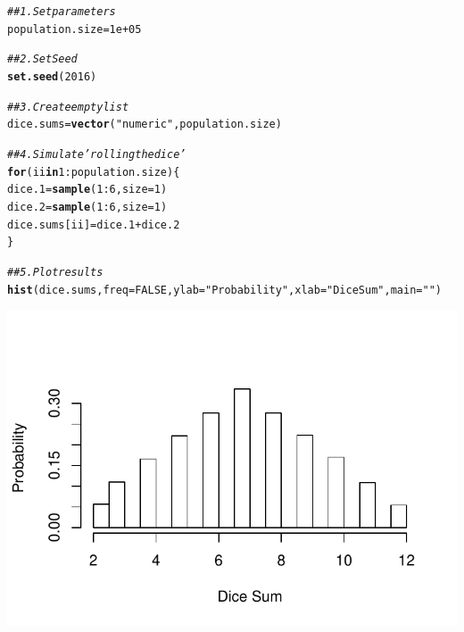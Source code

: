 \documentclass{report}\usepackage[]{graphicx}\usepackage[]{color}
\makeatletter
\def\maxwidth{ %
  \ifdim\Gin@nat@width>\linewidth
    \linewidth
  \else
    \Gin@nat@width
  \fi
}
\newcommand{\hlnum}[1]{\textcolor[rgb]{0.686,0.059,0.569}{#1}}%
\newcommand{\hlstr}[1]{\textcolor[rgb]{0.192,0.494,0.8}{#1}}%
\newcommand{\hlcom}[1]{\textcolor[rgb]{0.678,0.584,0.686}{\textit{#1}}}%
\newcommand{\hlopt}[1]{\textcolor[rgb]{0,0,0}{#1}}%
\newcommand{\hlstd}[1]{\textcolor[rgb]{0.345,0.345,0.345}{#1}}%
\newcommand{\hlkwa}[1]{\textcolor[rgb]{0.161,0.373,0.58}{\textbf{#1}}}%
\newcommand{\hlkwb}[1]{\textcolor[rgb]{0.69,0.353,0.396}{#1}}%
\newcommand{\hlkwc}[1]{\textcolor[rgb]{0.333,0.667,0.333}{#1}}%
\newcommand{\hlkwd}[1]{\textcolor[rgb]{0.737,0.353,0.396}{\textbf{#1}}}%
\newenvironment{kframe}{%
 \def\at@end@of@kframe{}%
 \ifinner\ifhmode%
  \def\at@end@of@kframe{\end{minipage}}%
  \begin{minipage}{\columnwidth}%
 \fi\fi%
 \def\FrameCommand##1{\hskip\@totalleftmargin \hskip-\fboxsep
 \colorbox{shadecolor}{##1}\hskip-\fboxsep
     \hskip-\linewidth \hskip-\@totalleftmargin \hskip\columnwidth}%
 \MakeFramed {\advance\hsize-\width
   \@totalleftmargin\z@ \linewidth\hsize
   \@setminipage}}%
 {\par\unskip\endMakeFramed%
 \at@end@of@kframe}
\newenvironment{knitrout}{}{} %
\makeatother
\begin{document}
\begin{knitrout}
\color{fgcolor}\begin{kframe}
\begin{alltt}
\hlcom{## 1. Set parameters}
\hlstd{population.size} \hlkwb{=} \hlnum{1e+05}

\hlcom{## 2. Set Seed}
\hlkwd{set.seed}\hlstd{(}\hlnum{2016}\hlstd{)}

\hlcom{## 3. Create empty list}
\hlstd{dice.sums} \hlkwb{=} \hlkwd{vector}\hlstd{(}\hlstr{"numeric"}\hlstd{, population.size)}

\hlcom{## 4. Simulate 'rolling the dice'}
\hlkwa{for} \hlstd{(ii} \hlkwa{in} \hlnum{1}\hlopt{:}\hlstd{population.size) \{}
    \hlstd{dice.1} \hlkwb{=} \hlkwd{sample}\hlstd{(}\hlnum{1}\hlopt{:}\hlnum{6}\hlstd{,} \hlkwc{size} \hlstd{=} \hlnum{1}\hlstd{)}
    \hlstd{dice.2} \hlkwb{=} \hlkwd{sample}\hlstd{(}\hlnum{1}\hlopt{:}\hlnum{6}\hlstd{,} \hlkwc{size} \hlstd{=} \hlnum{1}\hlstd{)}
    \hlstd{dice.sums[ii]} \hlkwb{=} \hlstd{dice.1} \hlopt{+} \hlstd{dice.2}
\hlstd{\}}

\hlcom{## 5. Plot results}
\hlkwd{hist}\hlstd{(dice.sums,} \hlkwc{freq} \hlstd{=} \hlnum{FALSE}\hlstd{,} \hlkwc{ylab} \hlstd{=} \hlstr{"Probability"}\hlstd{,} \hlkwc{xlab} \hlstd{=} \hlstr{"Dice Sum"}\hlstd{,} \hlkwc{main} \hlstd{=} \hlstr{""}\hlstd{)}
\end{alltt}
\end{kframe}

{\centering \includegraphics[width=\maxwidth]{figure/unnamed-chunk-44-1} 

}



\end{knitrout}
\end{document}
